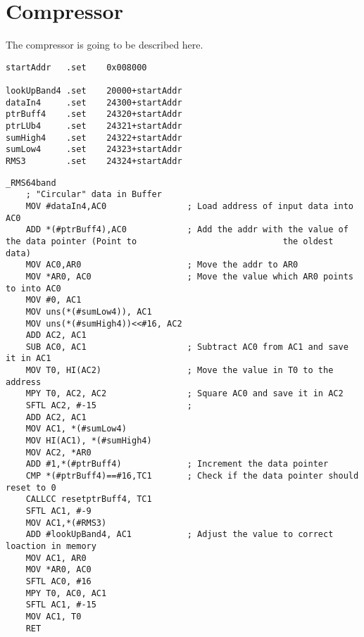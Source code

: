 \chapter{Compressor}

The compressor is going to be described here.

\begin{lstlisting}[language={[x86masm]Assembler}, caption = {Compressor Algorithm},label={listingCompressorDefines}]
startAddr	.set	0x008000

lookUpBand4	.set	20000+startAddr
dataIn4		.set	24300+startAddr
ptrBuff4	.set	24320+startAddr
ptrLUb4		.set	24321+startAddr
sumHigh4	.set	24322+startAddr
sumLow4		.set	24323+startAddr
RMS3		.set	24324+startAddr
\end{lstlisting}


\begin{lstlisting}[language={[x86masm]Assembler}, caption = {Compressor Algorithm},label={listingCompressorMain}]
_RMS64band
	; "Circular" data in Buffer
	MOV #dataIn4,AC0				; Load address of input data into AC0
	ADD *(#ptrBuff4),AC0			; Add the addr with the value of the data pointer (Point to 							the oldest data)
	MOV AC0,AR0						; Move the addr to AR0
	MOV *AR0, AC0					; Move the value which AR0 points to into AC0
	MOV #0, AC1
	MOV uns(*(#sumLow4)), AC1
	MOV uns(*(#sumHigh4))<<#16, AC2
	ADD AC2, AC1
	SUB AC0, AC1					; Subtract AC0 from AC1 and save it in AC1	 
	MOV T0, HI(AC2)					; Move the value in T0 to the address
	MPY T0, AC2, AC2				; Square AC0 and save it in AC2
	SFTL AC2, #-15					; 
	ADD AC2, AC1
	MOV AC1, *(#sumLow4)
	MOV HI(AC1), *(#sumHigh4)
	MOV AC2, *AR0
	ADD #1,*(#ptrBuff4)				; Increment the data pointer
	CMP *(#ptrBuff4)==#16,TC1		; Check if the data pointer should reset to 0
	CALLCC resetptrBuff4, TC1
	SFTL AC1, #-9
	MOV AC1,*(#RMS3)
	ADD #lookUpBand4, AC1			; Adjust the value to correct loaction in memory
	MOV AC1, AR0
	MOV *AR0, AC0
	SFTL AC0, #16
	MPY T0, AC0, AC1
	SFTL AC1, #-15
	MOV AC1, T0						
	RET
\end{lstlisting}
